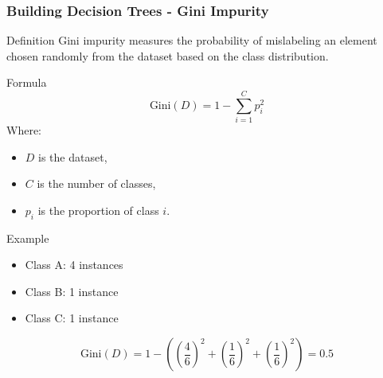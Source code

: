 \documentclass[aspectratio=169]{beamer}
\begin{document}
\begin{frame}[fragile]
    \frametitle{Building Decision Trees - Gini Impurity}
    \begin{block}{Definition}
        Gini impurity measures the probability of mislabeling an element chosen randomly from the dataset based on the class distribution.
    \end{block}
    
    \begin{block}{Formula}
        \begin{equation}
        \text{Gini}(D) = 1 - \sum_{i=1}^{C} p_i^2
        \end{equation}
        Where:
        \begin{itemize}
            \item \(D\) is the dataset,
            \item \(C\) is the number of classes,
            \item \(p_i\) is the proportion of class \(i\).
        \end{itemize}
    \end{block}
    
    \begin{block}{Example}
        \begin{itemize}
            \item Class A: 4 instances
            \item Class B: 1 instance
            \item Class C: 1 instance
        \end{itemize}
        \begin{equation}
        \text{Gini}(D) = 1 - \left(\left(\frac{4}{6}\right)^2 + \left(\frac{1}{6}\right)^2 + \left(\frac{1}{6}\right)^2\right) = 0.5
        \end{equation}
    \end{block}
\end{frame}
\end{document}
